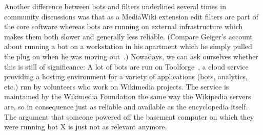 Another difference between bots and filters underlined several times in community discussions was that as a MediaWiki extension edit filters are part of the core software whereas bots are running on external infrastructure which makes them both slower and generally less reliable.
(Compare Geiger's account about running a bot on a workstation in his apartment which he simply pulled the plug on when he was moving out~\cite{Geiger2014}.)
Nowadays, we can ask ourselves whether this is still of significance:
A lot of bots are run on Toolforge~\cite{Wikimedia:Toolforge}, a cloud service providing a hosting environment for a variety of applications (bots, analytics, etc.) run by volunteers who work on Wikimedia projects.
The service is maintained by the Wikimedia Foundation the same way the Wikipedia servers are, so in consequence just as reliable and available as the encyclopedia itself.
The argument that someone powered off the basement computer on which they were running bot X is just not as relevant anymore.



